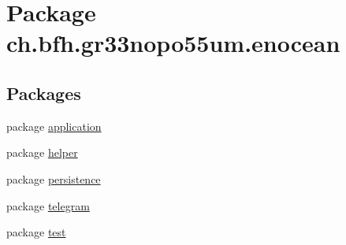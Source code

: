 \hypertarget{namespacech_1_1bfh_1_1gr33nopo55um_1_1enocean}{}\section{Package ch.\+bfh.\+gr33nopo55um.\+enocean}
\label{namespacech_1_1bfh_1_1gr33nopo55um_1_1enocean}
\subsection*{Packages}
\begin{DoxyCompactItemize}
\item 
package \hyperlink{namespacech_1_1bfh_1_1gr33nopo55um_1_1enocean_1_1application}{application}
\item 
package \hyperlink{namespacech_1_1bfh_1_1gr33nopo55um_1_1enocean_1_1helper}{helper}
\item 
package \hyperlink{namespacech_1_1bfh_1_1gr33nopo55um_1_1enocean_1_1persistence}{persistence}
\item 
package \hyperlink{namespacech_1_1bfh_1_1gr33nopo55um_1_1enocean_1_1telegram}{telegram}
\item 
package \hyperlink{namespacech_1_1bfh_1_1gr33nopo55um_1_1enocean_1_1test}{test}
\end{DoxyCompactItemize}
